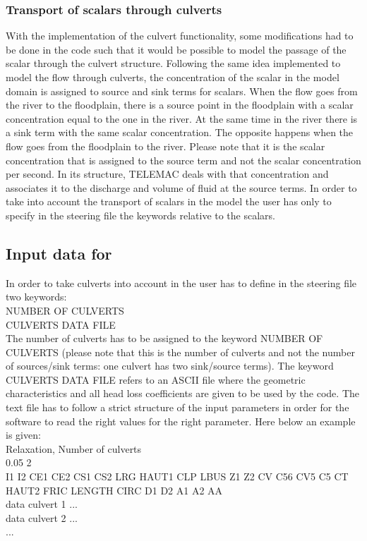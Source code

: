 \subsubsection{Transport of scalars through culverts}

With the implementation of the culvert functionality,
some modifications had to be done in the code such that
it would be possible to model the passage of the scalar through the culvert structure.
Following the same idea implemented to model the flow through culverts,
the concentration of the scalar in the model domain is assigned to source and sink terms
for scalars. When the flow goes from the river to the floodplain,
there is a source point in the floodplain with a scalar concentration equal to the one
in the river. At the same time in the river there is a sink term with the same scalar
concentration. The opposite happens when the flow goes from the floodplain to the river.
Please note that it is the scalar concentration that is assigned to the source term
and not the scalar concentration per second.
In its structure, TELEMAC deals with that concentration and associates it to the
discharge and volume of fluid at the source terms.
In order to take into account the transport of scalars in the model the
user has only to specify in the steering file the keywords relative to the scalars.

\subsection{Input data for }

In order to take culverts into account in  the user has to define in the
steering file two keywords: \\
NUMBER OF CULVERTS \\
CULVERTS DATA FILE\\

The number of culverts has to be assigned to the keyword NUMBER OF CULVERTS
(please note that this is the number of culverts and not the number of sources/sink terms:
one culvert has two sink/source terms).
The keyword CULVERTS DATA FILE refers to an ASCII file where the geometric characteristics
and all head loss coefficients are given to be used by the code.
The text file has to follow a strict structure of the input parameters in order
for the software to read the right values for the right parameter.
Here below an example is given:\\

Relaxation, Number of culverts\\
0.05 2\\
I1  I2  CE1  CE2  CS1  CS2  LRG HAUT1 CLP LBUS Z1 Z2 CV  C56  CV5  C5 CT HAUT2 FRIC LENGTH CIRC D1  D2 A1 A2 AA\\
data culvert 1  ...\\
data culvert 2 ...\\
... \\

